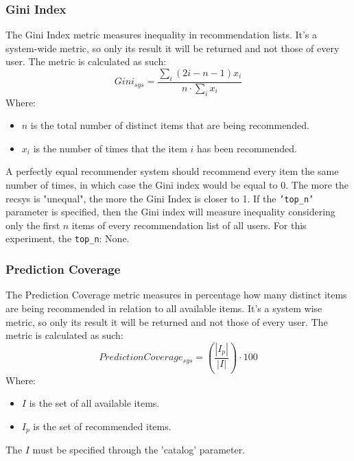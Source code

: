 \documentclass[11pt]{article}
\begin{document}
\subsubsection{Gini Index}\label{subsubsec:gini}
The Gini Index metric measures inequality in recommendation lists.
It's a system-wide metric, so only its result it will be returned and not those of every user.
The metric is calculated as such:
\hfill\break
\hfill\break
    \[
        Gini_{sys} = \frac{\sum_i(2i - n - 1)x_i}{n\cdot\sum_i x_i}
    \]
\hfill\break
\hfill\break
    Where:
\begin{itemize}
    \item $n$ is the total number of distinct items that are being recommended.
    \item $x_i$ is the number of times that the item $i$ has been recommended.
\end{itemize}
\hfill\break
\hfill\break
A perfectly equal recommender system should recommend every item the same number of times, in which case the Gini
index would be equal to 0.
The more the recsys is "unequal", the more the Gini Index is closer to 1. If the \texttt{'top\_n'} parameter is
specified, then the Gini index will measure inequality considering only the first $n$ items of every
recommendation list of all users.
For this experiment, the \texttt{top\_n}:
None.
\hfill\break
\hfill\break

\subsubsection{Prediction Coverage}\label{subsubsec:pred_cov}
The Prediction Coverage metric measures in percentage how many distinct items are being recommended in relation
to all available items.
It's a system wise metric, so only its result it will be returned and not those of every user.
The metric is calculated as such:
\hfill\break
\hfill\break
    \[
         Prediction Coverage_{sys} = (\frac{|I_p|}{|I|})\cdot100
    \]
\hfill\break
\hfill\break
    Where:
\begin{itemize}
    \item $I$ is the set of all available items.
    \item $I_p$ is the set of recommended items.
\end{itemize}
\hfill\break
\hfill\break
The $I$ must be specified through the 'catalog' parameter.
\hfill\break
\hfill\break
\end{document}
